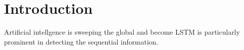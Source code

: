 \section{Introduction}
Artificial intellgence is sweeping the global and become
LSTM is particularly prominent in detecting the sequential information. 
